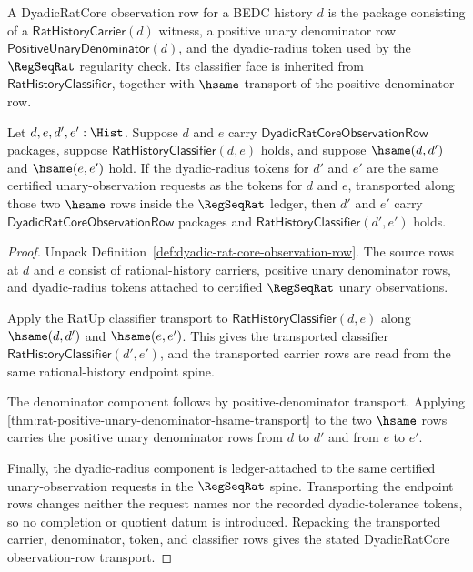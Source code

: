 \begin{definition}
\label{def:dyadic-rat-core-observation-row}
A DyadicRatCore observation row for a BEDC history $d$ is the package consisting
of a $\mathsf{RatHistoryCarrier}(d)$ witness, a positive unary denominator row
$\mathsf{PositiveUnaryDenominator}(d)$, and the dyadic-radius token used by the
$\RegSeqRat$ regularity check. Its classifier face is inherited from
$\mathsf{RatHistoryClassifier}$, together with $\hsame$ transport of the
positive-denominator row.
\end{definition}

\begin{theorem}
\label{thm:dyadic-rat-core-observation-row-classifier-transport}
Let $d,e,d',e':\Hist$. Suppose $d$ and $e$ carry
$\mathsf{DyadicRatCoreObservationRow}$ packages, suppose
$\mathsf{RatHistoryClassifier}(d,e)$ holds, and suppose
$\hsame(d,d')$ and $\hsame(e,e')$ hold. If the dyadic-radius tokens for
$d'$ and $e'$ are the same certified unary-observation requests as the
tokens for $d$ and $e$, transported along those two $\hsame$ rows inside the
$\RegSeqRat$ ledger, then $d'$ and $e'$ carry
$\mathsf{DyadicRatCoreObservationRow}$ packages and
$\mathsf{RatHistoryClassifier}(d',e')$ holds.
\end{theorem}
\begin{proof}
Unpack Definition~\ref{def:dyadic-rat-core-observation-row}. The source rows
at $d$ and $e$ consist of rational-history carriers, positive unary
denominator rows, and dyadic-radius tokens attached to certified
$\RegSeqRat$ unary observations.

Apply the RatUp classifier transport to
$\mathsf{RatHistoryClassifier}(d,e)$ along $\hsame(d,d')$ and
$\hsame(e,e')$. This gives the transported classifier
$\mathsf{RatHistoryClassifier}(d',e')$, and the transported carrier rows are
read from the same rational-history endpoint spine.

The denominator component follows by positive-denominator transport. Applying
\autoref{thm:rat-positive-unary-denominator-hsame-transport} to the two
$\hsame$ rows carries the positive unary denominator rows from $d$ to $d'$
and from $e$ to $e'$.

Finally, the dyadic-radius component is ledger-attached to the same certified
unary-observation requests in the $\RegSeqRat$ spine. Transporting the
endpoint rows changes neither the request names nor the recorded
dyadic-tolerance tokens, so no completion or quotient datum is introduced.
Repacking the transported carrier, denominator, token, and classifier rows
gives the stated DyadicRatCore observation-row transport.
\end{proof}

